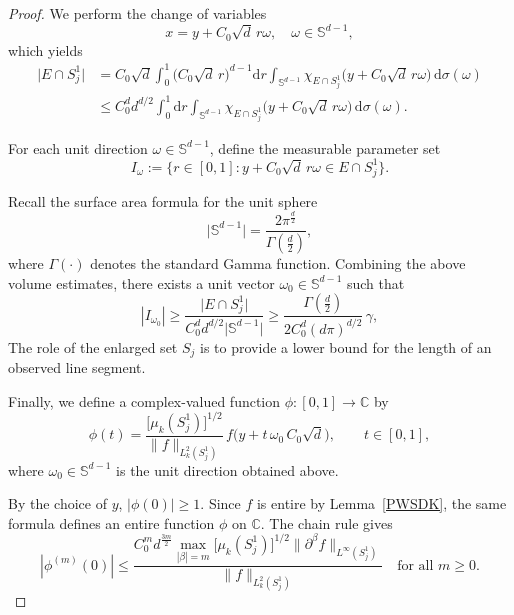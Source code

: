 \documentclass[12pt]{article}
\begin{document}
\begin{proof}
We perform the change of variables
\[
x = y + C_0\sqrt{d} \, r \omega, \quad \omega \in \mathbb{S}^{d-1},
\]
which yields
\[
\begin{aligned}
\big|E \cap S_j^1\big| &= C_0\sqrt{d} \int_{0}^{1} \big(C_0\sqrt{d}\, r\big)^{d-1} \mathrm{d}r \int_{\mathbb{S}^{d-1}} \chi_{E \cap S_j^1}\big(y + C_0\sqrt{d} \, r \omega\big) \, \mathrm{d}\sigma(\omega) \\
&\leq C_0^d d^{d/2} \int_{0}^{1} \mathrm{d}r \int_{\mathbb{S}^{d-1}} \chi_{E \cap S_j^1}\big(y + C_0\sqrt{d} \, r \omega\big) \, \mathrm{d}\sigma(\omega).
\end{aligned}
\]

For each unit direction $\omega \in \mathbb{S}^{d-1}$, define the measurable parameter set
\[
I_\omega := \big\{ r \in [0,1] : y + C_0\sqrt{d} \, r \omega \in E \cap S_j^1 \big\}.
\]

Recall the surface area formula for the unit sphere
\[
\big|\mathbb{S}^{d-1}\big| = \frac{2\pi^{\frac{d}{2}}}{\Gamma(\frac{d}{2})},
\]
where $\Gamma(\cdot)$ denotes the standard Gamma function. Combining the above volume estimates, there exists a unit vector $\omega_0 \in \mathbb{S}^{d-1}$ such that
\begin{equation}\label{E11}
|I_{\omega_0}| \ge \frac{\big|E \cap S_j^1\big|}{C_0^d d^{d/2} \big|\mathbb{S}^{d-1}\big|} \ge \frac{\Gamma(\frac{d}{2})}{2C_0^d(d\pi)^{d/2}} \, \gamma,
\end{equation}
The role of the enlarged set $S_j$ is to provide a lower bound for the length of an observed line segment.

Finally, we define a complex-valued function $\phi : [0,1] \to \mathbb{C}$ by
\begin{equation}\label{E9}
\phi(t) = \frac{\big[\mu_k(S_j^1)\big]^{1/2}}{\| f \|_{L_k^2(S_j^1)}} \, f\big(y + t \, \omega_0 \, C_0 \sqrt{d}\big),\qquad t \in [0,1],
\end{equation}
where $\omega_0 \in \mathbb{S}^{d-1}$ is the unit direction obtained above.

By the choice of $y$, $|\phi(0)|\ge1$. Since $f$ is entire by Lemma~\ref{PWSDK}, the same formula defines an entire function $\phi$ on $\mathbb{C}$. The chain rule gives
\[
|\phi^{(m)}(0)| \leq \frac{C_0^{m} d^{\frac{3m}{2}} \max_{|\beta|=m} \big[\mu_k(S_j^1)\big]^{1/2} \|\partial^\beta f\|_{L^\infty(S_j^1)}}{\| f \|_{L_k^2(S_j^1)}} \quad \text{for all } m \geq 0.
\]


\end{proof}
\end{document}
